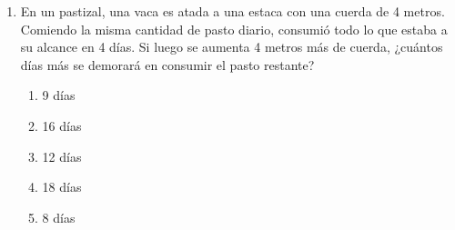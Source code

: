 \begin{enumerate}[resume]
	\begin{enumerate}[label=\alph*)]
		\item 140
		\item 124
		\item 144
		\item 112
		\item 104
	\end{enumerate}
	
	\textbf{Respuesta correcta:} a)
	
	\vspace{2mm}
	\textbf{Solucionario:}
	
	La proporción: $\dfrac{a}{b} = \dfrac{c}{d} \quad \text{(I)}$
	
	Se le quita la misma cantidad:
	$\left. \begin{array}{l} 
		a - x = 20 \Rightarrow a = 20 + x \\
		b - x = 28 \Rightarrow b = 28 + x \\
		c - x = 32 \Rightarrow c = 32 + x \\
		d - x = 44 \Rightarrow d = 44 + x 
	\end{array} \right\} \text{(II)}$
	
	Se tendrá que:\\
	$a + b + c + d = 124 + 4x \quad \text{(III)}$
	
	Reemplazando (II) en (I) y resolviendo:
	$\dfrac{20 + x}{28 + x} = \dfrac{32 + x}{44 + x} \Rightarrow 880 + 64x + x^2 = 896 + 60x + x^2$
	
	$4x = 16 \Rightarrow x = 4$
	
	Se pide $a + b + c + d = ?$
	
	De (III): $a + b + c + d = 124 + 4(4) =$
	
	\vspace{6mm}


\item En un pastizal, una vaca es atada a una estaca con una cuerda de 4 metros. Comiendo la misma cantidad de pasto diario, consumió todo lo que estaba a su alcance en 4 días. Si luego se aumenta 4 metros más de cuerda, ¿cuántos días más se demorará en consumir el pasto restante?

\begin{enumerate}[label=\alph*)]
	\item 9 días
	\item 16 días
	\item 12 días
	\item 18 días
	\item 8 días
\end{enumerate}


\end{enumerate}
